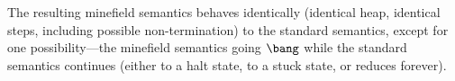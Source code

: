 % 
% 
% 

The resulting minefield semantics behaves identically
(identical heap, identical steps, including possible non-termination)
to the standard semantics, except for one possibility---the
minefield semantics going $\bang$ while the standard semantics
continues (either to a halt state, to a stuck state, or reduces forever).



